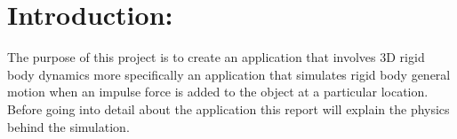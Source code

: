 \section{Introduction:}
The purpose of this project is to create an application that involves 3D rigid body dynamics more specifically an application that simulates rigid body general motion when an impulse force is added to the object at a particular location.
Before going into detail about the application this report will explain the physics behind the simulation.